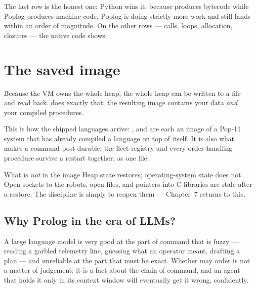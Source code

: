 The last row is the honest one: Python wins it, because 
produces bytecode while Poplog produces machine code. Poplog is doing
strictly more work and still lands within an order of magnitude. On the
other rows --- calls, loops, allocation, closures --- the native code shows.

\section{The saved image}

Because the VM owns the whole heap, the whole heap can be written to a file
and read back.  does exactly that; the resulting
 image contains your data \emph{and} your compiled procedures.


This is how the shipped languages arrive: ,
 and  are each an image of a Pop-11 system
that has already compiled a language on top of itself. It is also what makes
a command post durable: the fleet registry and every order-handling
procedure survive a restart together, as one file.

\begin{callout}{What is \emph{not} in the image}
Heap state restores; operating-system state does not. Open sockets to the
robots, open files, and pointers into C libraries are stale after a restore.
The discipline is simply to reopen them --- Chapter~7 returns to this.
\end{callout}

\subsection{Why Prolog in the era of LLMs?}

A large language model is very good at the part of command that is fuzzy ---
reading a garbled telemetry line, guessing what an operator meant, drafting a
plan --- and unreliable at the part that must be exact. Whether 
may order  is not a matter of judgement; it is a fact about the
chain of command, and an agent that holds it only in its context window will
eventually get it wrong, confidently.

